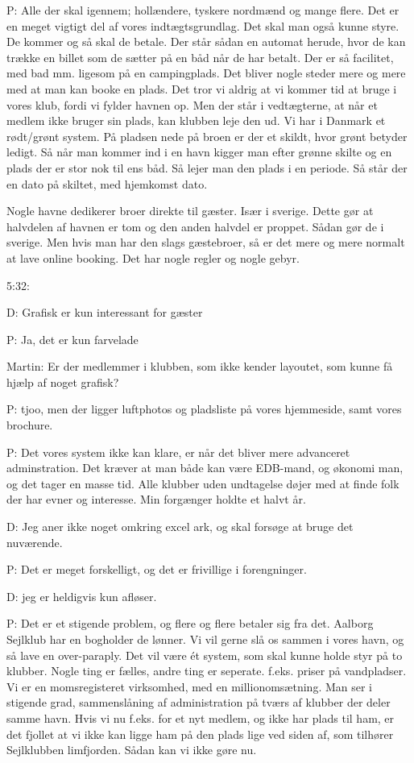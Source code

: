 P: Alle der skal igennem; hollændere, tyskere nordmænd og mange flere. Det er en meget vigtigt del af vores indtægtsgrundlag. Det skal man også kunne styre. De kommer og så skal de betale. Der står sådan en automat herude, hvor de kan trække en billet som de sætter på en båd når de har betalt. Der er så facilitet, med bad mm. ligesom på en campingplads. Det bliver nogle steder mere og mere med at man kan booke en plads. Det tror vi aldrig at vi kommer tid at bruge i vores klub, fordi vi fylder havnen op. Men der står i vedtægterne, at når et medlem ikke bruger sin plads, kan klubben leje den ud. Vi har i Danmark et rødt/grønt system. På pladsen nede på broen er der et skildt, hvor grønt betyder ledigt. Så når man kommer ind i en havn kigger man efter grønne skilte og en plads der er stor nok til ens båd. Så lejer man den plads i en periode. Så står der en dato på skiltet, med hjemkomst dato.

Nogle havne dedikerer broer direkte til gæster. Især i sverige. Dette gør at halvdelen af havnen er tom og den anden halvdel er proppet. Sådan gør de i sverige. Men hvis man har den slags gæstebroer, så er det mere og mere normalt at lave online booking. Det har nogle regler og nogle gebyr.

5:32:

D: Grafisk er kun interessant for gæster

P: Ja, det er kun farvelade

Martin: Er der medlemmer i klubben, som ikke kender layoutet, som kunne få hjælp af noget grafisk?

P: tjoo, men der ligger luftphotos og pladsliste på vores hjemmeside, samt vores brochure.

P: Det vores system ikke kan klare, er når det bliver mere advanceret adminstration. Det kræver at man både kan være EDB-mand, og økonomi man, og det tager en masse tid. Alle klubber uden undtagelse døjer med at finde folk der har evner og interesse. Min forgænger holdte et halvt år.

D: Jeg aner ikke noget omkring excel ark, og skal forsøge at bruge det nuværende.

P: Det er meget forskelligt, og det er frivillige i forengninger.

D: jeg er heldigvis kun afløser.

P: Det er et stigende problem, og flere og flere betaler sig fra det. Aalborg Sejlklub har en bogholder de lønner. Vi vil gerne slå os sammen i vores havn, og så lave en over-paraply. Det vil være ét system, som skal kunne holde styr på to klubber. Nogle ting er fælles, andre ting er seperate. f.eks. priser på vandpladser. Vi er en momsregisteret virksomhed, med en millionomsætning. Man ser i stigende grad, sammenslåning af administration på tværs af klubber der deler samme havn. Hvis vi nu f.eks. for et nyt medlem, og ikke har plads til ham, er det fjollet at vi ikke kan ligge ham på den plads lige ved siden af, som tilhører Sejlklubben limfjorden. Sådan kan vi ikke gøre nu.

